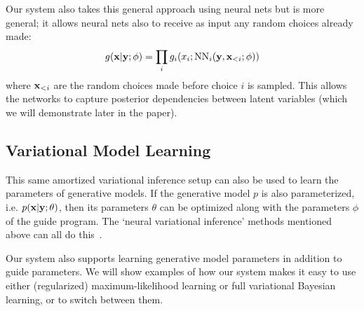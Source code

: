 Our system also takes this general approach using neural nets but is more general; it allows neural nets also to receive as input any random choices already made:
\begin{equation*}
g(\mathbf{x} | \mathbf{y} ; \phi) = \prod_i g_i(x_i ; \text{NN}_i(\mathbf{y}, \mathbf{x}_{<i} ; \phi))
\end{equation*}
where $\mathbf{x}_{<i}$ are the random choices made before choice $i$ is sampled. This allows the networks to capture posterior dependencies between latent variables (which we will demonstrate later in the paper).

\subsection{Variational Model Learning}

This same amortized variational inference setup can also be used to learn the parameters of generative models. If the generative model $p$ is also parameterized, i.e. $p(\mathbf{x} | \mathbf{y} ; \theta)$, then its parameters $\theta$ can be optimized along with the parameters $\phi$ of the guide program.
The `neural variational inference' methods mentioned above can all do this~\cite{NVIL,DLGM,AEVB}.

Our system also supports learning generative model parameters in addition to guide parameters.
We will show examples of how our system makes it easy to use either (regularized) maximum-likelihood learning or full variational Bayesian learning, or to switch between them.

